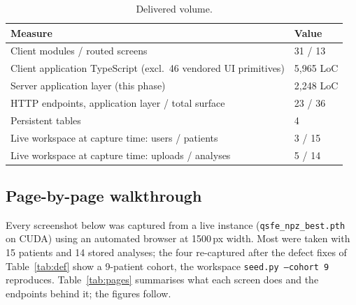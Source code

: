 \documentclass[11pt,a4paper]{article}
\newcommand{\code}[1]{\texttt{#1}}
\begin{document}
\begin{table}[H]\centering\caption{Delivered volume.}\label{tab:vol}\footnotesize
\begin{tabularx}{\linewidth}{@{}Y R{2.4cm}@{}}
\toprule \textbf{Measure} & \textbf{Value} \\ \midrule
Client modules / routed screens & 31 / 13 \\
Client application TypeScript (excl.\ 46 vendored UI primitives) & 5{,}965 LoC \\
Server application layer (this phase) & 2{,}248 LoC \\
HTTP endpoints, application layer / total surface & 23 / 36 \\
Persistent tables & 4 \\
Live workspace at capture time: users / patients & 3 / 15 \\
Live workspace at capture time: uploads / analyses & 5 / 14 \\
\bottomrule
\end{tabularx}
\end{table}

\subsection{Page-by-page walkthrough}
\label{sec:walk}

Every screenshot below was captured from a live instance
(\code{qsfe\_npz\_best.pth} on CUDA) using an automated browser at 1500\,px
width. Most were taken with 15 patients and 14 stored analyses; the four
re-captured after the defect fixes of Table~\ref{tab:def} show a 9-patient
cohort, the workspace \code{seed.py --cohort 9} reproduces. Table~\ref{tab:pages} summarises
what each screen does and the endpoints behind it; the figures follow.
\end{document}
